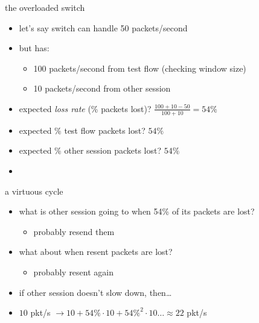 \begin{frame}{the overloaded switch}
\begin{itemize}
\item let's say switch can handle 50 packets/second
\item but has:
    \begin{itemize}
    \item 100 packets/second from test flow (checking window size) 
    \item 10 packets/second from other session
    \end{itemize}
\item expected \textit{loss rate} (\% packets lost)? $\frac{100+10-50}{100+10}=54\%$
\item expected \% test flow packets lost? $54\%$
\item expected \% other session packets lost? $54\%$
\item<2-> 
\end{itemize}
\end{frame}

\begin{frame}{a virtuous cycle}
\begin{itemize}
\item what is other session going to when 54\% of its packets are lost?
    \begin{itemize}
    \item probably resend them
    \end{itemize}
\item what about when resent packets are lost?
    \begin{itemize}
    \item probably resent again
    \end{itemize}
\vspace{.5cm}
\item if other session doesn't slow down, then\ldots
\item $10$ pkt/s $\rightarrow10+54\%\cdot10+54\%^2\cdot10 \ldots\approx 22$ pkt/s
\end{itemize}
\end{frame}


